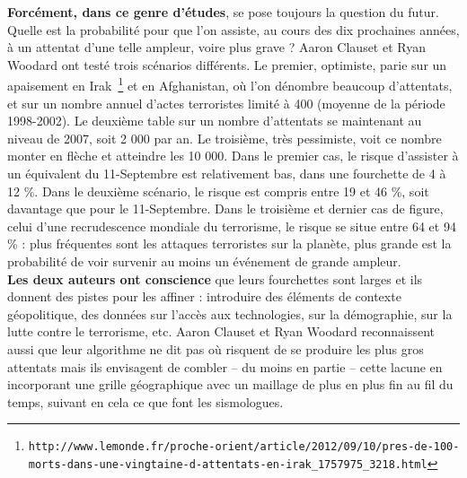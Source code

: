 \documentclass[11pt,twoside,a4paper]{article}
\begin{document}
\begin{multicols}{2}
	\textbf{Forc{\'e}ment, dans ce genre d'{\'e}tudes}, se pose toujours la question du futur. Quelle est la probabilit{\'e} pour que l'on assiste, au cours des dix prochaines ann{\'e}es, {\`a} un attentat d'une telle ampleur, voire plus grave ? Aaron Clauset et Ryan Woodard ont test{\'e} trois sc{\'e}narios diff{\'e}rents. Le premier, optimiste, parie sur un apaisement en Irak~\footnote{\texttt{http://www.lemonde.fr/proche-orient/article/2012/09/10/pres-de-100-morts-dans-une-vingtaine-d-attentats-en-irak\_1757975\_3218.html}} et en Afghanistan, o{\`u} l'on d{\'e}nombre beaucoup d'attentats, et sur un nombre annuel d'actes terroristes limit{\'e} {\`a} 400 (moyenne de la p{\'e}riode 1998-2002). Le deuxi{\`e}me table sur un nombre d'attentats se maintenant au niveau de 2007, soit 2 000 par an. Le troisi{\`e}me, tr{\`e}s pessimiste, voit ce nombre monter en fl{\`e}che et atteindre les 10 000. Dans le premier cas, le risque d'assister {\`a} un {\'e}quivalent du 11-Septembre est relativement bas, dans une fourchette de 4 {\`a} 12 \%. Dans le deuxi{\`e}me sc{\'e}nario, le risque est compris entre 19 et 46 \%, soit davantage que pour le 11-Septembre. Dans le troisi{\`e}me et dernier cas de figure, celui d'une recrudescence mondiale du terrorisme, le risque se situe entre 64 et 94 \% : plus fr{\'e}quentes sont les attaques terroristes sur la plan{\`e}te, plus grande est la probabilit{\'e} de voir survenir au moins un {\'e}v{\'e}nement de grande ampleur. ~\\
	
	\textbf{Les deux auteurs ont conscience} que leurs fourchettes sont larges et ils donnent des pistes pour les affiner : introduire des {\'e}l{\'e}ments de contexte g{\'e}opolitique, des donn{\'e}es sur l'acc{\`e}s aux technologies, sur la d{\'e}mographie, sur la lutte contre le terrorisme, etc. Aaron Clauset et Ryan Woodard reconnaissent aussi que leur algorithme ne dit pas o{\`u} risquent de se produire les plus gros attentats mais ils envisagent de combler -- du moins en partie -- cette lacune en incorporant une grille g{\'e}ographique avec un maillage de plus en plus fin au fil du temps, suivant en cela ce que font les sismologues. ~\\
	

\end{multicols}
\end{document}
